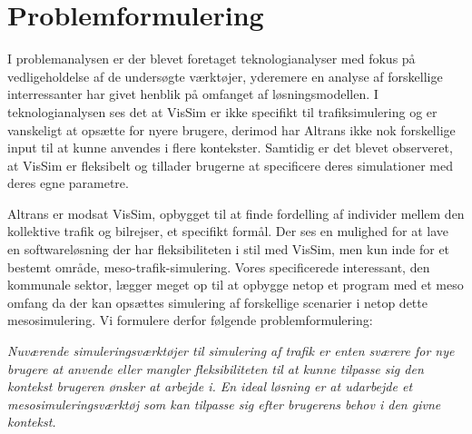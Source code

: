 \chapter{Problemformulering}\label{Problemformulering}

I problemanalysen er der blevet foretaget teknologianalyser med fokus på vedligeholdelse af de undersøgte værktøjer, yderemere en analyse af forskellige interressanter har givet henblik på omfanget af løsningsmodellen. I teknologianalysen ses det at VisSim er ikke specifikt til trafiksimulering og er vanskeligt at opsætte for nyere brugere, derimod har Altrans ikke nok forskellige input til at kunne anvendes i flere kontekster. Samtidig er det blevet observeret, at VisSim er fleksibelt og tillader brugerne at specificere deres simulationer med deres egne parametre.

\vspace{5mm}

Altrans er modsat VisSim, opbygget til at finde fordelling af individer mellem den kollektive trafik og bilrejser, et specifikt formål. Der ses en mulighed for at lave en softwareløsning der har fleksibiliteten i stil med VisSim, men kun inde for et bestemt område, meso-trafik-simulering. Vores specificerede interessant, den kommunale sektor, lægger meget op til at opbygge netop et program med et meso omfang da der kan opsættes simulering af forskellige scenarier i netop dette mesosimulering. Vi formulere derfor følgende problemformulering:

\vspace{5mm}

\begin{center}
\textit{Nuværende simuleringsværktøjer til simulering af trafik er enten sværere for nye brugere at anvende eller mangler fleksibiliteten til at kunne tilpasse sig den kontekst brugeren ønsker at arbejde i. En ideal løsning er at udarbejde et mesosimuleringsværktøj som kan tilpasse sig efter brugerens behov i den givne kontekst.}
\end{center}